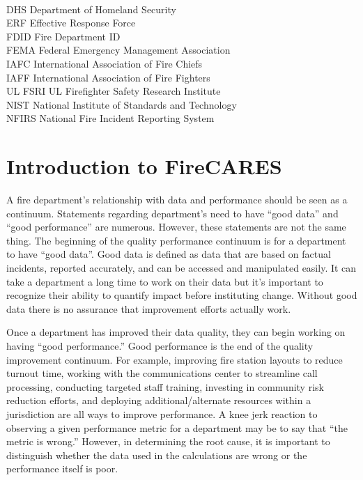 \documentclass[12pt,oneside]{book}
\begin{document}
\begin{tabbing}
\hspace{1.5in} \= \\

DHS \> Department of Homeland Security \\
ERF \> Effective Response Force \\
FDID \> Fire Department ID \\
FEMA \> Federal Emergency Management Association \\
IAFC \> International Association of Fire Chiefs \\
IAFF \> International Association of Fire Fighters \\
UL FSRI \> UL Firefighter Safety Research Institute \\
NIST \> National Institute of Standards and Technology  \\
NFIRS \> National Fire Incident Reporting System \\
\end{tabbing}

\newpage
\mainmatter

\chapter{Introduction to FireCARES}
A fire department's relationship with data and performance should be seen as a continuum. Statements regarding department's need to have ``good data'' and ``good performance'' are numerous. However, these statements are not the same thing. The beginning of the quality performance continuum is for a department to have ``good data''. Good data is defined as data that are based on factual incidents, reported accurately, and can be accessed and manipulated easily. It can take a department a long time to work on their data but it's important to recognize their ability to quantify impact before instituting change. Without good data there is no assurance that improvement efforts actually work.

Once a department has improved their data quality, they can begin working on having ``good performance.'' Good performance is the end of the quality improvement continuum. For example, improving fire station layouts to reduce turnout time, working with the communications center to streamline call processing, conducting targeted staff training, investing in community risk reduction efforts, and deploying additional/alternate resources within a jurisdiction are all ways to improve performance. 
A knee jerk reaction to observing a given performance metric for a department may be to say that ``the metric is wrong.'' However, in determining the root cause, it is important to distinguish whether the data used in the calculations are wrong or the performance itself is poor.  
\end{document}

